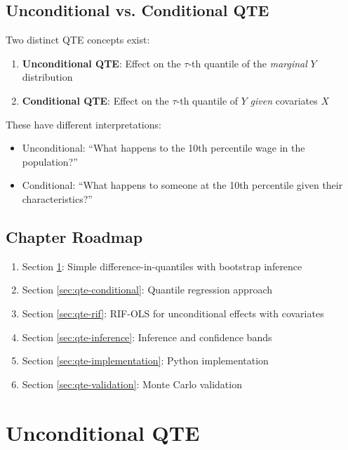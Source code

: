 \subsection{Unconditional vs. Conditional QTE}

Two distinct QTE concepts exist:
\begin{enumerate}
    \item \textbf{Unconditional QTE}: Effect on the $\tau$-th quantile of the \emph{marginal} $Y$ distribution
    \item \textbf{Conditional QTE}: Effect on the $\tau$-th quantile of $Y$ \emph{given} covariates $X$
\end{enumerate}

These have different interpretations:
\begin{itemize}
    \item Unconditional: ``What happens to the 10th percentile wage in the population?''
    \item Conditional: ``What happens to someone at the 10th percentile given their characteristics?''
\end{itemize}

\subsection{Chapter Roadmap}

\begin{enumerate}
    \item Section \ref{sec:qte-unconditional}: Simple difference-in-quantiles with bootstrap inference
    \item Section \ref{sec:qte-conditional}: Quantile regression approach
    \item Section \ref{sec:qte-rif}: RIF-OLS for unconditional effects with covariates
    \item Section \ref{sec:qte-inference}: Inference and confidence bands
    \item Section \ref{sec:qte-implementation}: Python implementation
    \item Section \ref{sec:qte-validation}: Monte Carlo validation
\end{enumerate}

\section{Unconditional QTE}
\label{sec:qte-unconditional}

